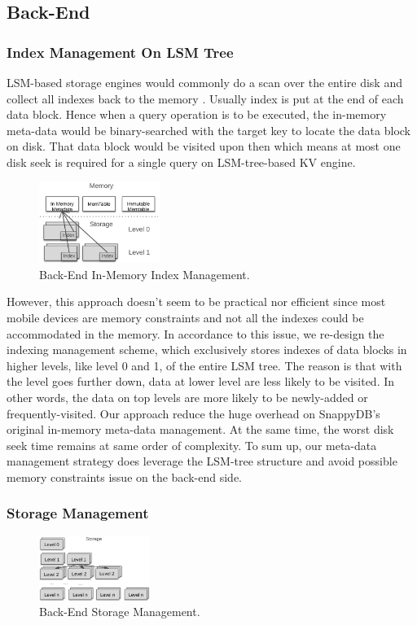 \subsection{Back-End}
	\subsubsection{Index Management On LSM Tree}

 	LSM-based storage engines would commonly do a scan over the entire disk and collect all indexes back to the memory \cite{190528}. Usually index is put at the end of each data block. Hence when a query operation is to be executed, the in-memory meta-data would be binary-searched with the target key to locate the data block on disk. That data block would be visited upon then which means at most one disk seek is required for a single query on LSM-tree-based KV engine. 
 			\begin{figure}
 		\centering
 		\includegraphics[width=0.35\textwidth]{pic/Back-Index.png}
 		\caption{Back-End In-Memory Index Management.}
 		\label{fig:back-index}
 		\centering
 	\end{figure}
 	However, this approach doesn't seem to be practical nor efficient since most mobile devices are memory constraints and not all the indexes could be accommodated in the memory. In accordance to this issue, we re-design the indexing management scheme, which exclusively stores indexes of data blocks in higher levels, like level 0 and 1, of the entire LSM tree. The reason is that with the level goes further down, data at lower level are less likely to be visited. In other words, the data on top levels are more likely to be newly-added or frequently-visited. Our approach reduce the huge overhead on SnappyDB's original in-memory meta-data management. At the same time, the worst disk seek time remains at same order of complexity. To sum up, our meta-data management strategy does leverage the LSM-tree structure and avoid possible memory constraints issue on the back-end side.
	
	\subsubsection{Storage Management}
		\begin{figure}[h]
		\centering
		\includegraphics[width=0.32\textwidth]{pic/Back-Disk.pdf}
		\caption{Back-End Storage Management.}
		\label{fig:BackDisk}
		\centering
	\end{figure}

